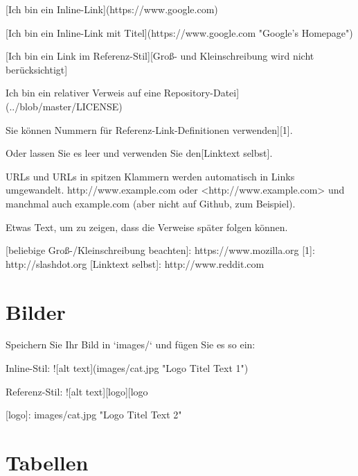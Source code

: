 \documentclass[12pt,de-CH,twoside,openright]{report}
\newenvironment{Shaded}{\begin{snugshade}}{\end{snugshade}}
\newcommand{\AlertTok}[1]{\textcolor[rgb]{0.94,0.16,0.16}{#1}}
\newcommand{\BaseNTok}[1]{\textcolor[rgb]{0.00,0.00,0.81}{#1}}
\newcommand{\NormalTok}[1]{#1}
\newcommand{\OtherTok}[1]{\textcolor[rgb]{0.56,0.35,0.01}{#1}}
\begin{document}
\begin{Shaded}
\begin{Highlighting}[]
\OtherTok{[Ich bin ein Inline-Link](https://www.google.com)}

\OtherTok{[Ich bin ein Inline-Link mit Titel](https://www.google.com "Google's Homepage")}

\OtherTok{[Ich bin ein Link im Referenz-Stil][Groß- und Kleinschreibung wird nicht berücksichtigt]}

\NormalTok{Ich bin ein relativer Verweis auf eine Repository-Datei](../blob/master/LICENSE)}

\NormalTok{Sie können Nummern für Referenz-Link-Definitionen verwenden][1].}

\NormalTok{Oder lassen Sie es leer und verwenden Sie den[Linktext selbst].}

\NormalTok{URLs und URLs in spitzen Klammern werden automatisch in Links umgewandelt.}
\NormalTok{http://www.example.com oder }\OtherTok{<http://www.example.com>}\NormalTok{ und manchmal auch}
\NormalTok{example.com (aber nicht auf Github, zum Beispiel).}

\NormalTok{Etwas Text, um zu zeigen, dass die Verweise später folgen können.}

\OtherTok{[beliebige Groß-/Kleinschreibung beachten]: https://www.mozilla.org}
\OtherTok{[1]: http://slashdot.org}
\OtherTok{[Linktext selbst]: http://www.reddit.com}
\end{Highlighting}
\end{Shaded}

\hypertarget{bilder}{%
\section{Bilder}\label{bilder}}

\begin{Shaded}
\begin{Highlighting}[]
\NormalTok{Speichern Sie Ihr Bild in }\BaseNTok{`images/`}\NormalTok{ und fügen Sie es so ein:}

\NormalTok{Inline-Stil:}
\AlertTok{![alt text](images/cat.jpg "Logo Titel Text 1")}

\NormalTok{Referenz-Stil:}
\AlertTok{![alt text][logo]}\NormalTok{[logo}

\OtherTok{[logo]: images/cat.jpg "Logo Titel Text 2"}
\end{Highlighting}
\end{Shaded}

\hypertarget{tabellen}{%
\section{Tabellen}\label{tabellen}}
\end{document}

